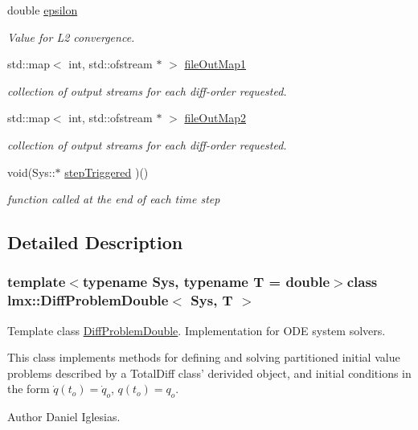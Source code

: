 \begin{DoxyCompactItemize}
double \hyperlink{classlmx_1_1DiffProblemDouble_ac53d73fc5d13aacb043c9a49aa8af7a7}{epsilon}
\begin{DoxyCompactList}\small\item\em Value for L2 convergence. \end{DoxyCompactList}\item 
std\-::map$<$ int, std\-::ofstream $\ast$ $>$ \hyperlink{classlmx_1_1DiffProblemDouble_aa26e0b530cc5b78b32383515a7932a97}{file\-Out\-Map1}
\begin{DoxyCompactList}\small\item\em collection of output streams for each diff-\/order requested. \end{DoxyCompactList}\item 
std\-::map$<$ int, std\-::ofstream $\ast$ $>$ \hyperlink{classlmx_1_1DiffProblemDouble_a17946e26033b4dc383b37756b39097a5}{file\-Out\-Map2}
\begin{DoxyCompactList}\small\item\em collection of output streams for each diff-\/order requested. \end{DoxyCompactList}\item 
void(Sys\-::$\ast$ \hyperlink{classlmx_1_1DiffProblemDouble_a86019217395c38514e7765294dc55ac8}{step\-Triggered} )()
\begin{DoxyCompactList}\small\item\em function called at the end of each time step \end{DoxyCompactList}\end{DoxyCompactItemize}


\subsection{Detailed Description}
\subsubsection*{template$<$typename Sys, typename T = double$>$class lmx\-::\-Diff\-Problem\-Double$<$ Sys, T $>$}

Template class \hyperlink{classlmx_1_1DiffProblemDouble}{Diff\-Problem\-Double}. Implementation for O\-D\-E system solvers. 

This class implements methods for defining and solving partitioned initial value problems described by a Total\-Diff class' derivided object, and initial conditions in the form $ \dot{q}(t_o) = \dot{q}_o $, $ q(t_o) = q_o $.

\begin{DoxyAuthor}{Author}
Daniel Iglesias. 
\end{DoxyAuthor}


